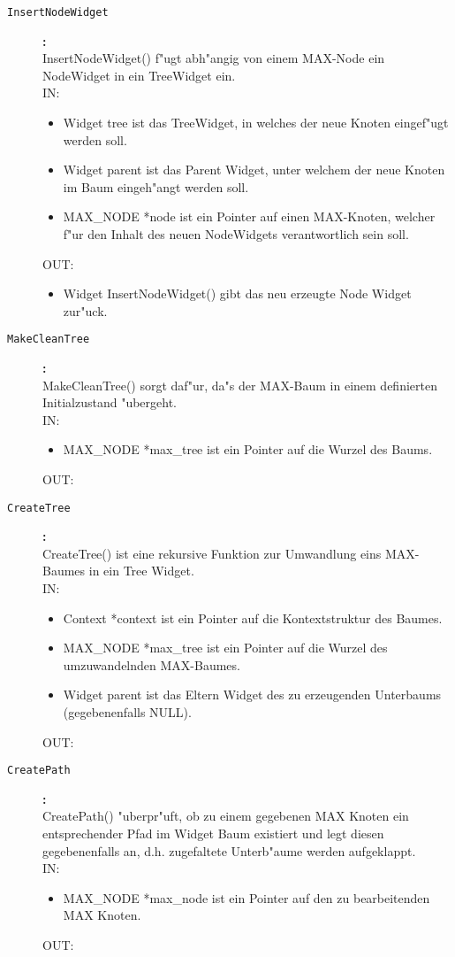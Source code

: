 \begin{description}
\item[\tt InsertNodeWidget]{\bf :\\}
InsertNodeWidget() f"ugt abh"angig von einem MAX-Node ein NodeWidget in ein TreeWidget ein. \\
IN:
\begin{itemize}
   \item Widget tree ist das TreeWidget, in welches der neue Knoten eingef"ugt werden soll.
   \item Widget parent ist das Parent Widget, unter welchem der neue Knoten im Baum eingeh"angt werden soll.
   \item MAX\_NODE *node ist ein Pointer auf einen MAX-Knoten, welcher f"ur den Inhalt des neuen NodeWidgets verantwortlich sein soll.
\end{itemize}
OUT:
\begin{itemize}
   \item Widget InsertNodeWidget() gibt das neu erzeugte Node Widget zur"uck.
\end{itemize}

\item[\tt MakeCleanTree]{\bf :\\}
MakeCleanTree() sorgt daf"ur, da"s der MAX-Baum in einem definierten Initialzustand "ubergeht. \\
IN:
\begin{itemize}
   \item MAX\_NODE *max\_tree ist ein Pointer auf die Wurzel des Baums.
\end{itemize}
OUT:

\item[\tt CreateTree]{\bf :\\}
CreateTree() ist eine rekursive Funktion zur Umwandlung eins MAX-Baumes in ein Tree Widget. \\
IN:
\begin{itemize}
   \item Context *context ist ein Pointer auf die Kontextstruktur des Baumes.
   \item MAX\_NODE *max\_tree ist ein Pointer auf die Wurzel des umzuwandelnden MAX-Baumes.
   \item Widget parent ist das Eltern Widget des zu erzeugenden Unterbaums (gegebenenfalls NULL).
\end{itemize}
OUT:

\item[\tt CreatePath]{\bf :\\}
CreatePath() "uberpr"uft, ob zu einem gegebenen MAX Knoten ein entsprechender Pfad im Widget Baum existiert und legt diesen gegebenenfalls an, d.h. zugefaltete Unterb"aume werden aufgeklappt. \\
IN:
\begin{itemize}
   \item MAX\_NODE *max\_node ist ein Pointer auf den zu bearbeitenden MAX Knoten.
\end{itemize}
OUT:


\end{description}
